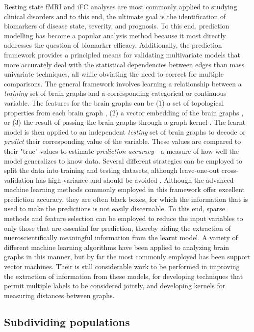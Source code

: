 Resting state fMRI and iFC analyses are most commonly applied to studying clinical disorders and to this end, the ultimate goal is the identification of biomarkers of disease state, severity, and prognosis\cite{DiMartino}. To this end, prediction modelling has become a popular analysis method because it most directly addresses the question of biomarker efficacy\cite{Craddock,Dosenbach,review}. Additionally, the prediction framework provides a principled means for validating multivariate models that more accurately deal with the statistical dependencies between edges than mass univariate techniques, all while obviating the need to correct for multiple comparisons. The general framework involves learning a relationship between a \emph{training} set of brain graphs and a corresponding categorical or continuous variable. The features for the brain graphs can be (1) a set of topological properties from each brain graph \cite{Cecci2009, Bassett2012}, (2) a vector embedding of the brain graphs \cite{Richiadi2013,Luo2003}, or (3) the result of passing the brain graphs through a graph kernel \cite{}. The learnt model is then applied to an independent \emph{testing} set of brain graphs to decode or \emph{predict} their corresponding value of the variable. These values are compared to their "true" values to estimate \emph{prediction accuracy} - a measure of how well the model generalizes to know data. Several different strategies can be employed to split the data into training and testing datasets, although leave-one-out cross-validation has high variance and should be avoided \cite{}. Although the advanced machine learning methods commonly employed in this framework offer excellent prediction accuracy, they are often black boxes, for which the information that is used to make the predictions is not easily discernable. To this end, sparse methods and feature selection can be employed to reduce the input variables to only those that are essential for prediction, thereby aiding the extraction of nueroscientifically meaningful information from the learnt model. A variety of different machine learning algorithms have been applied to analyzing brain graphs in this manner, but by far the most commonly employed has been support vector machines\cite{DiMartino}. Their is still considerable work to be performed in improving the extraction of information from these models, for developing techniques that permit multiple labels to be considered jointly, and developing kernels for measuring distances between graphs.

\subsection{Subdividing populations}


